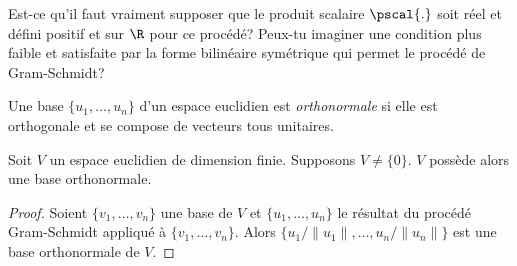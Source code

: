 \begin{exercise}
  \label{exe:6}
  Est-ce qu'il faut vraiment supposer que le produit scalaire
  $\pscal{.}$
  soit réel et défini positif et sur $\R$ pour ce procédé? Peux-tu imaginer une condition plus
  faible et satisfaite par la forme bilinéaire symétrique  qui permet
  le procédé de Gram-Schmidt? 
\end{exercise}



\begin{definition}
  \label{def:7}
  Une base $\{u_1,\dots,u_n\}$
  d'un espace euclidien est \emph{orthonormale} si elle est
  orthogonale et se compose de vecteurs tous unitaires.
\end{definition}




\begin{corollary}
  \label{co:1}
  Soit $V$
  un espace euclidien de dimension finie. Supposons $V \neq
  \{0\}$. $V$ possède alors une base orthonormale.
\end{corollary}

\begin{proof}
  Soient $\{v_1,\dots,v_n\}$ une base de $V$ et $\{u_1,\dots,u_n\}$ le résultat du procédé Gram-Schmidt appliqué à $\{v_1,\dots,v_n\}$. Alors $\{u_1/ \|u_1\|,\dots,u_n/\|u_n\|\}$ est une base orthonormale de $V$. 
\end{proof}


